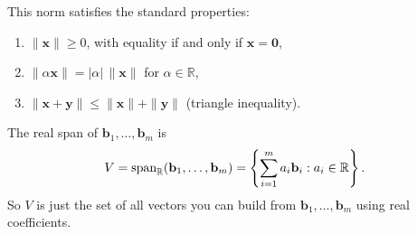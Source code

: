 \newpage
{}
\begin{remark}
This norm satisfies the standard properties:
\begin{enumerate}
	\item \(\|\mathbf{x}\|\ge 0\), with equality if and only if \(\mathbf{x}=\mathbf{0}\),
	\item \(\|\alpha \mathbf{x}\| = |\alpha|\,\|\mathbf{x}\|\) for \(\alpha \in \mathbb{R}\),
	\item \(\|\mathbf{x}+\mathbf{y}\| \le \|\mathbf{x}\|+\|\mathbf{y}\|\) (triangle inequality).
\end{enumerate}
\end{remark}

\medskip
{}
\begin{remark}[span]
The real span of \(\mathbf b_1,\dots,\mathbf b_m\) is
\[
V=\textrm{span}_{\mathbb{R}}(\textbf{b}_1,\dots,\textbf{b}_m)=\left\{\sum_{i=1}^m a_i\mathbf b_i : a_i\in\mathbb R\right\}.
\]
So \(V\) is just the set of all vectors you can build from \(\mathbf b_1,\dots,\mathbf b_m\) using real coefficients.
\end{remark}

\medskip

